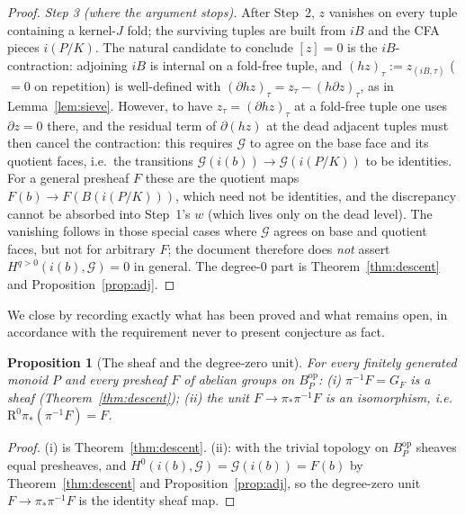 \documentclass[11pt]{article}
\newtheorem{proposition}[theorem]{Proposition}
\theoremstyle{definition}
\newcommand{\op}{\mathrm{op}}
\begin{document}
\begin{proof}
\emph{Step 3 (where the argument stops).} After Step~2, $z$
vanishes on every tuple containing a kernel-$J$ fold; the surviving
tuples are built from $iB$ and the CFA pieces $i(P/K)$. The natural
candidate to conclude $[z]=0$ is the $iB$-contraction: adjoining
$iB$ is internal on a fold-free tuple, and
$(hz)_\tau:=z_{(iB,\tau)}$ \textup{(}$=0$ on repetition\textup{)} is
well-defined with $(\partial hz)_\tau=z_\tau-(h\partial z)_\tau$,
as in Lemma~\ref{lem:sieve}. However, to have
$z_\tau=(\partial hz)_\tau$ at a fold-free tuple one uses
$\partial z=0$ there, and the residual term of $\partial(hz)$ at the
dead adjacent tuples must then cancel the contraction: this requires
$\mathcal G$ to agree on the base face and its quotient faces, i.e.\
the transitions $\mathcal G(i(b))\to\mathcal G(i(P/K))$ to be
identities. For a general presheaf $F$ these are the quotient maps
$F(b)\to F(B(i(P/K)))$, which need not be identities, and the
discrepancy cannot be absorbed into Step~1's $w$
\textup{(}which lives only on the dead level\textup{)}. The
vanishing follows in those special cases where $\mathcal G$ agrees
on base and quotient faces, but not for arbitrary $F$; the document
therefore does \emph{not} assert $H^{q>0}(i(b),\mathcal G)=0$ in
general. The degree-$0$ part is Theorem~\ref{thm:descent} and
Proposition~\ref{prop:adj}.
\end{proof}

We close by recording exactly what has been proved and what remains
open, in accordance with the requirement never to present conjecture
as fact.

\begin{proposition}[The sheaf and the degree-zero unit]\label{thm:main-end}
For every finitely generated monoid $P$ and every presheaf $F$ of
abelian groups on $B_P^{\op}$:
\textup{(}i\textup{)} $\pi^{-1}F=G_F$ is a sheaf
\textup{(}Theorem~\ref{thm:descent}\textup{)}; \textup{(}ii\textup{)}
the unit $F\to\pi_*\pi^{-1}F$ is an isomorphism, i.e.\
$\mathrm R^{0}\pi_*(\pi^{-1}F)=F$.
\end{proposition}

\begin{proof}
(i) is Theorem~\ref{thm:descent}. (ii): with the trivial topology on
$B_P^{\op}$ sheaves equal presheaves, and
$H^0(i(b),\mathcal G)=\mathcal G(i(b))=F(b)$ by
Theorem~\ref{thm:descent} and Proposition~\ref{prop:adj}, so the
degree-zero unit $F\to\pi_*\pi^{-1}F$ is the identity sheaf map.
\end{proof}
\end{document}
